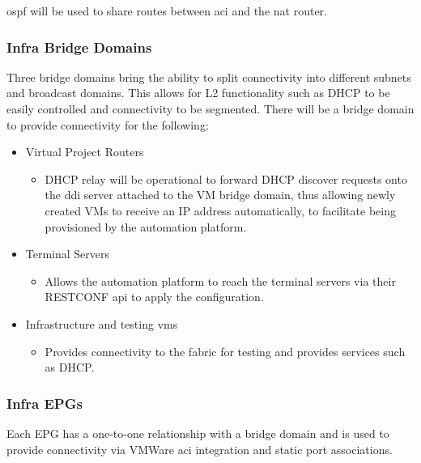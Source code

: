 \gls{ospf} will be used to share routes between \gls{aci}
and the \gls{nat} router.

\subsubsection{Infra Bridge Domains}
Three bridge
domains bring the ability to split connectivity into different subnets and
broadcast domains. This allows for L2 functionality such as DHCP to be easily
controlled and connectivity to be segmented. There will be a bridge domain to
provide connectivity for the following:
\begin{itemize}
    \item Virtual
          Project Routers
          \begin{itemize}
              \item DHCP relay will be
                    operational to forward DHCP discover requests onto the \gls{ddi} server
                    attached to the VM bridge domain, thus allowing newly created VMs to receive an
                    IP address automatically, to facilitate being provisioned by the automation
                    platform.
          \end{itemize}
    \item Terminal Servers
          \begin{itemize}

              \item Allows the automation platform to reach the terminal servers via their
                    RESTCONF \gls{api} to apply the configuration.
          \end{itemize}
    \item
          Infrastructure and testing \gls{vm}s
          \begin{itemize}
              \item Provides
                    connectivity to the fabric for testing and provides services such as DHCP.

          \end{itemize}
\end{itemize}

\subsubsection{Infra EPGs}
Each EPG has a
one-to-one relationship with a bridge domain and is used to provide
connectivity via VMWare \gls{aci} integration and static port associations.

